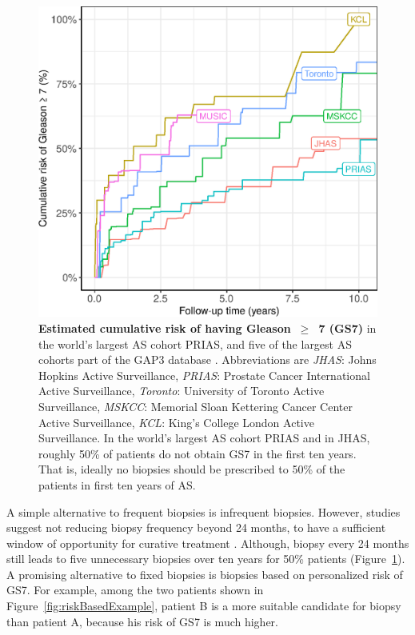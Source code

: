 \begin{figure}[!htb]
\centerline{\includegraphics[width=\columnwidth]{images/npmle_plot.eps}}
\caption{\textbf{Estimated cumulative risk of having Gleason~$\geq$~7 (GS7)} in the world's largest AS cohort PRIAS, and five of the largest AS cohorts part of the GAP3 database \citep{gap3_2018}. Abbreviations are \textit{JHAS}: Johns Hopkins Active Surveillance, \textit{PRIAS}: Prostate Cancer International Active Surveillance, \textit{Toronto}: University of Toronto Active Surveillance, \textit{MSKCC}: Memorial Sloan Kettering Cancer Center Active Surveillance, \textit{KCL}: King's College London Active Surveillance. In the world's largest AS cohort PRIAS and in JHAS, roughly 50\% of patients do not obtain GS7 in the first ten years. That is, ideally no biopsies should be prescribed to 50\% of the patients in first ten years of AS.}
\label{fig:npmle_plot}
\end{figure}

A simple alternative to frequent biopsies is infrequent biopsies. However, studies suggest not reducing biopsy frequency beyond 24 months, to have a sufficient window of opportunity for curative treatment \citep{inoue2018comparative,de2017estimating}. Although, biopsy every 24 months still leads to five unnecessary biopsies over ten years for 50\% patients (Figure~\ref{fig:npmle_plot}). A promising alternative to fixed biopsies is biopsies based on personalized risk of GS7. For example, among the two patients shown in Figure~\ref{fig:riskBasedExample}, patient B is a more suitable candidate for biopsy than patient A, because his risk of GS7 is much higher. %

